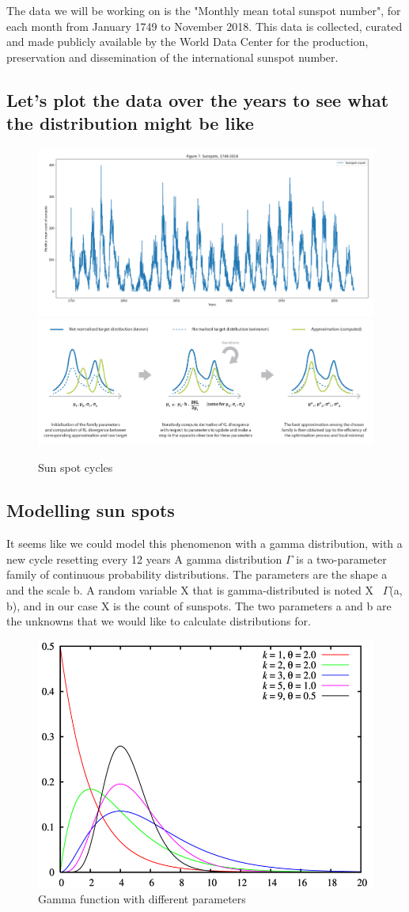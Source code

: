 The data we will be working on is the "Monthly mean total sunspot number", for each month from January 1749 to November 2018. This data is collected, curated and made publicly available by the World Data Center for the production, preservation and dissemination of the international sunspot number.

\subsection{Let's plot the data over the years to see what the distribution might be like}

\begin{figure}[h]
    \centering
\includegraphics[width=.48\textwidth]{pic/p05c08-snip07}
\includegraphics[width=.48\textwidth]{pic/p05c08-snip08}
    \caption{Sun spot cycles}
    \label{fig:p05c08-snip07}
\end{figure}

\FloatBarrier

\subsection{Modelling sun spots}
It seems like we could model this phenomenon with a gamma distribution, with a new cycle resetting every 12 years
A gamma distribution  $\Gamma$ is a two-parameter family of continuous probability distributions. The parameters are the shape a and the scale b. A random variable X that is gamma-distributed is noted X~ $\Gamma$(a, b), and in our case X is the count of sunspots. The two parameters a and b are the unknowns that we would like to calculate distributions for.

\begin{figure}[h]
    \centering
\includegraphics[width=.6\textwidth]{pic/p05c08-snip09}
    \caption{Gamma function with different parameters}
    \label{fig:p05c08-snip09}
\end{figure}

